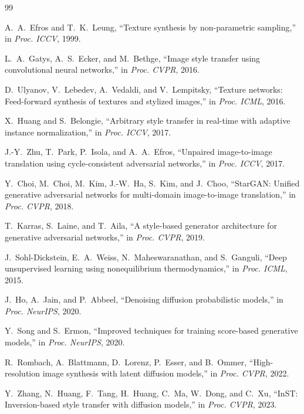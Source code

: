 \documentclass[10pt,twocolumn]{article}
\begin{document}
\begin{thebibliography}{99}

 A.~A.~Efros and T.~K.~Leung, ``Texture synthesis by non-parametric sampling,'' in \emph{Proc. ICCV}, 1999.

 L.~A.~Gatys, A.~S.~Ecker, and M.~Bethge, ``Image style transfer using convolutional neural networks,'' in \emph{Proc. CVPR}, 2016.

 D.~Ulyanov, V.~Lebedev, A.~Vedaldi, and V.~Lempitsky, ``Texture networks: Feed-forward synthesis of textures and stylized images,'' in \emph{Proc. ICML}, 2016.

 X.~Huang and S.~Belongie, ``Arbitrary style transfer in real-time with adaptive instance normalization,'' in \emph{Proc. ICCV}, 2017.

 J.-Y.~Zhu, T.~Park, P.~Isola, and A.~A.~Efros, ``Unpaired image-to-image translation using cycle-consistent adversarial networks,'' in \emph{Proc. ICCV}, 2017.

 Y.~Choi, M.~Choi, M.~Kim, J.-W.~Ha, S.~Kim, and J.~Choo, ``StarGAN: Unified generative adversarial networks for multi-domain image-to-image translation,'' in \emph{Proc. CVPR}, 2018.

 T.~Karras, S.~Laine, and T.~Aila, ``A style-based generator architecture for generative adversarial networks,'' in \emph{Proc. CVPR}, 2019.

 J.~Sohl-Dickstein, E.~A.~Weiss, N.~Maheswaranathan, and S.~Ganguli, ``Deep unsupervised learning using nonequilibrium thermodynamics,'' in \emph{Proc. ICML}, 2015.

 J.~Ho, A.~Jain, and P.~Abbeel, ``Denoising diffusion probabilistic models,'' in \emph{Proc. NeurIPS}, 2020.

 Y.~Song and S.~Ermon, ``Improved techniques for training score-based generative models,'' in \emph{Proc. NeurIPS}, 2020.

 R.~Rombach, A.~Blattmann, D.~Lorenz, P.~Esser, and B.~Ommer, ``High-resolution image synthesis with latent diffusion models,'' in \emph{Proc. CVPR}, 2022.

 Y.~Zhang, N.~Huang, F.~Tang, H.~Huang, C.~Ma, W.~Dong, and C.~Xu, ``InST: Inversion-based style transfer with diffusion models,'' in \emph{Proc. CVPR}, 2023.


\end{thebibliography}
\end{document}
